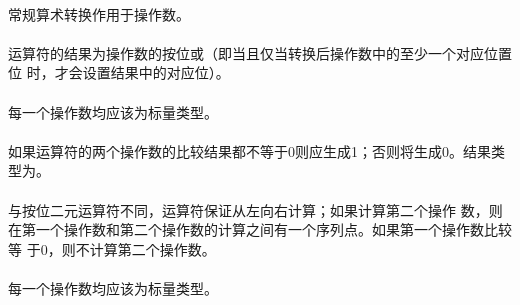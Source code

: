 {\semantic
\paragraph{}
常规算术转换作用于操作数。

\paragraph{}
运算符\tm{|}的结果为操作数的按位或（即当且仅当转换后操作数中的至少一个对应位置位
时，才会设置结果中的对应位）。

\syntax
\paragraph{}

\constraint
\paragraph{}
每一个操作数均应该为标量类型。

\semantic
\paragraph{}
如果\tm{\&\&}运算符的两个操作数的比较结果都不等于0则应生成1；否则将生成0。结果类
型为。

\paragraph{}
与按位二元\tm{\&}运算符不同，\tm{\&\&}运算符保证从左向右计算；如果计算第二个操作
数，则在第一个操作数和第二个操作数的计算之间有一个序列点。如果第一个操作数比较等
于0，则不计算第二个操作数。

\syntax
\paragraph{}

\constraint
\paragraph{}
每一个操作数均应该为标量类型。

}
